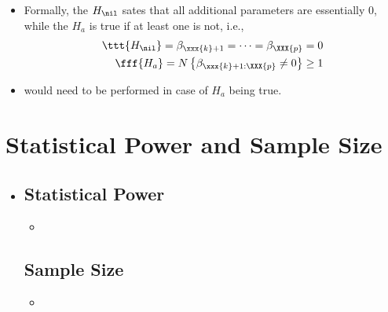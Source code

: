 \begin{itemize}
\begin{itemize}
\begin{itemize}
        \end{itemize}
      \item Formally, the \(H_\nil\) sates that all additional parameters are essentially 0, while the \(H_a\) is true if at least one is not, i.e.,
      \begin{align*}
        \ttt{H_\nil} = \beta_{\xxx{k}+1} = \cdots = \beta_\XXX{p} = 0 \\
        \fff{H_a} = N\left\{\beta_{\xxx{k}+1:\XXX{p}} \neq 0\right\} \geq 1
      \end{align*}
      \item \hyperref[Subsection: Post Hoc Comparisons]{} would need to be performed in case of \(H_a\) being true.
  \end{itemize}
\end{itemize}

\section{Statistical Power and Sample Size}
\begin{itemize}
  \item []
  
  \subsection{Statistical Power}
  \begin{itemize}
    \item 
  \end{itemize}

  \subsection{Sample Size}
  \begin{itemize}
    \item 
  \end{itemize}
  
\end{itemize}
